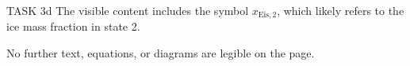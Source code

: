 TASK 3d  
The visible content includes the symbol \( x_{\text{Eis},2} \), which likely refers to the ice mass fraction in state 2.  

No further text, equations, or diagrams are legible on the page.